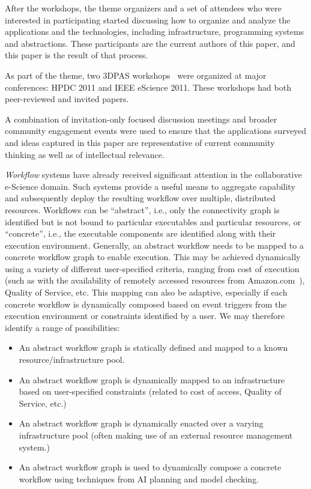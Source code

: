 After the workshops, the theme organizers and a set of attendees who
were interested in participating started discussing how to organize
and analyze the applications and the technologies, including
infrastructure, programming systems and abstractions.  These
participants are the current authors of this paper, and this paper is
the result of that process.

As part of the theme, two 3DPAS workshops~\cite{3dapas,D3-escience}
were organized at major conferences: HPDC 2011 and IEEE eScience 2011.
These workshops had both peer-reviewed and invited papers.

A combination of invitation-only focused discussion meetings and
broader community engagement events were used to ensure that the
applications surveyed and ideas captured in this paper are
representative of current community thinking as well as of
intellectual relevance.




{\em Workflow} systems have already received significant attention in
the collaborative e-Science domain.  Such systems provide a useful
means to aggregate capability and subsequently deploy the resulting
workflow over multiple, distributed resources. Workflows can be
``abstract'', i.e., only the connectivity graph is identified but is
not bound to particular executables and particular resources, or
``concrete'', i.e., the executable components are identified along
with their execution environment. Generally, an abstract workflow
needs to be mapped to a concrete workflow graph to enable
execution. This may be achieved dynamically using a variety of
different user-specified criteria, ranging from cost of execution
(such as with the availability of remotely accessed resources from
Amazon.com~\cite{berriman11}), Quality of Service, etc. This mapping
can also be adaptive, especially if each concrete workflow is
dynamically composed based on event triggers from the execution
environment or constraints identified by a user. We may therefore
identify a range of possibilities:

\begin{itemize}

\item An abstract workflow graph is statically defined and mapped to a known resource/infrastructure pool.

\item An abstract workflow graph is dynamically mapped to an infrastructure based on user-specified constraints (related to cost of access, Quality of Service, etc.)

\item An abstract workflow graph is dynamically enacted over a varying infrastructure pool (often making use of an external resource management system.)

\item An abstract workflow graph is used to dynamically compose a concrete workflow using techniques from AI planning and model checking.

\end{itemize}

